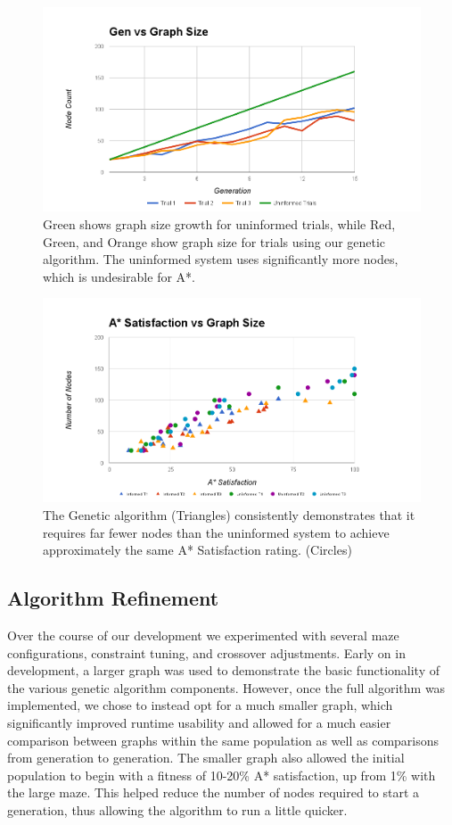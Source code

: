 	\begin{figure}
		\includegraphics[width=\textwidth]{tests/gengraphsize}
		\caption{Green shows graph size growth for uninformed trials, while Red, Green, and Orange show graph size for trials using our genetic algorithm. The uninformed system uses significantly more nodes, which is undesirable for A*.}
	\end{figure}
	
	\begin{figure}
		\includegraphics[width=\textwidth]{tests/satgraphsize}
		\caption{The Genetic algorithm (Triangles) consistently demonstrates that it requires far fewer nodes than the uninformed system to achieve approximately the same A* Satisfaction rating. (Circles)}
	\end{figure}
	
	\subsection{Algorithm Refinement}
	Over the course of our development we experimented with several maze configurations, constraint tuning, and crossover adjustments. Early on in development, a larger graph was used to demonstrate the basic functionality of the various genetic algorithm components. However, once the full algorithm was implemented, we chose to instead opt for a much smaller graph, which significantly improved runtime usability and allowed for a much easier comparison between graphs within the same population as well as comparisons from generation to generation. The smaller graph also allowed the initial population to begin with a fitness of 10-20\% A* satisfaction, up from 1\% with the large maze. This helped reduce the number of nodes required to start a generation, thus allowing the algorithm to run a little quicker.
	
